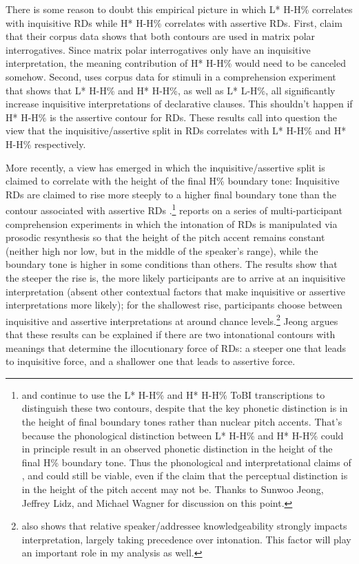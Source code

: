 \documentclass[output=paper,colorlinks,citecolor=brown]{langscibook}
\begin{document}
	\largerpage
	There is some reason to doubt this empirical picture in which L* H-H\% correlates with inquisitive RDs while H* H-H\% correlates with assertive RDs. First, \citet{hedberg17} claim that their corpus data shows that both contours are used in matrix polar interrogatives. Since matrix polar interrogatives only have an inquisitive interpretation, the meaning contribution of H* H-H\% would need to be canceled somehow. Second, \citet{nilsenova06} uses corpus data for stimuli in a comprehension experiment that shows that L* H-H\% and H* H-H\%, as well as L* L-H\%, all significantly increase inquisitive interpretations of declarative clauses. This shouldn't happen if H* H-H\% is the assertive contour for RDs. These results call into question the view that the inquisitive/assertive split in RDs correlates with L* H-H\% and H* H-H\% respectively. 
	
	More recently, a view has emerged in which the inquisitive/assertive split is claimed to correlate with the height of the final H\% boundary tone: Inquisitive RDs are claimed to rise more steeply to a higher final boundary tone than the contour associated with assertive RDs \citep{jeong18, rudin18, westera18}.\footnote{\citet{jeong18} and \citet{rudin18} continue to use the L* H-H\% and H* H-H\% ToBI transcriptions to distinguish these two contours, despite that the key phonetic distinction is in the height of final boundary tones rather than nuclear pitch accents. That's because the phonological distinction between L* H-H\% and H* H-H\%  could in principle result in an observed phonetic distinction in the height of the final H\% boundary tone. Thus the phonological and interpretational claims of \citet{pierrehumbert90}, \citet{hirschberg95} and \citet{truckenbrodt12} could still be viable, even if the claim that the perceptual distinction is in the height of the pitch accent may not be. Thanks to Sunwoo Jeong, Jeffrey Lidz, and Michael Wagner for discussion on this point.} \citet[320ff.]{jeong18} reports on a series of multi-participant comprehension experiments in which the intonation of RDs is manipulated via prosodic resynthesis so that the height of the pitch accent remains constant (neither high nor low, but in the middle of the speaker's range), while the boundary tone is higher in some conditions than others. The results show that the steeper the rise is, the more likely participants are to arrive at an inquisitive interpretation (absent other contextual factors that make inquisitive or assertive interpretations more likely); for the shallowest rise, participants choose between inquisitive and assertive interpretations at around chance levels.\footnote{\citet{jeong18} also shows that relative speaker/addressee knowledgeability strongly impacts interpretation, largely taking precedence over intonation. This factor will play an important role in my analysis as well.} Jeong argues that these results can be explained if there are two intonational contours with meanings that determine the illocutionary force of RDs: a steeper one that leads to inquisitive force, and a shallower one that leads to assertive force. 
	
\end{document}
